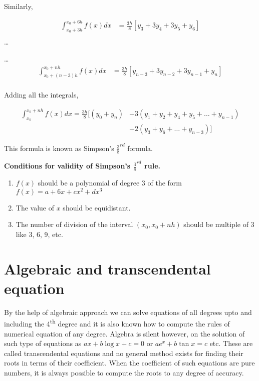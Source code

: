 \documentclass[11pt, a4paper]{article}
\begin{document}
Similarly,

\begin{align*}
  \int_{x_0+3h}^{x_0+6h}f(x)dx &= \frac{3h}{8}[y_3+3y_4+3y_5+y_6]\\
\end{align*}
\dots

\dots
\begin{align*}
  \int_{x_0+(n-3)h}^{x_0+nh}f(x)dx &= \frac{3h}{8}[y_{n-3}+3y_{n-2}+3y_{n-1}+y_n]\\
\end{align*}

Adding all the integrals,

\begin{align*}
  \int_{x_0}^{x_0+nh}f(x)dx=\frac{3h}{8}[(y_0+y_n) &+ 3(y_1+y_2+y_4+y_5+\dots+y_{n-1})\\
                                                   &+ 2(y_3+y_6+\dots+y_{n-3})]
\end{align*}

This formula is known as Simpson's $\frac{3}{8}^{rd}$ formula.

\textbf{Conditions for validity of Simpson's $\frac{3}{8}^{rd}$ rule.}

\begin{enumerate}
  \item $f(x)$ should be a polynomial of degree 3 of the form 
    $f(x)=a+6x+cx^2+dx^3$
  \item The value of $x$ should be equidistant.
  \item The number of division of the interval $(x_0,x_0+nh)$
    should be multiple of 3 like 3, 6, 9, etc.
\end{enumerate}%

\section{Algebraic and transcendental equation}
By the help of algebraic approach we can solve equations of all degrees upto and including the 4\textsuperscript{th} degree and it is also known how to compute the rules of numerical equation of any degree. Algebra is silent however, on the solution of such type of equations as $ax+b\log x+c=0$ or $ae^x+b\tan x=c$ etc. These are called transcendental equations and no general method exists for finding their roots in terms of their coefficient. When the coefficient of such equations are pure numbers, it is always possible to compute the roots to any degree of accuracy.
\end{document}
